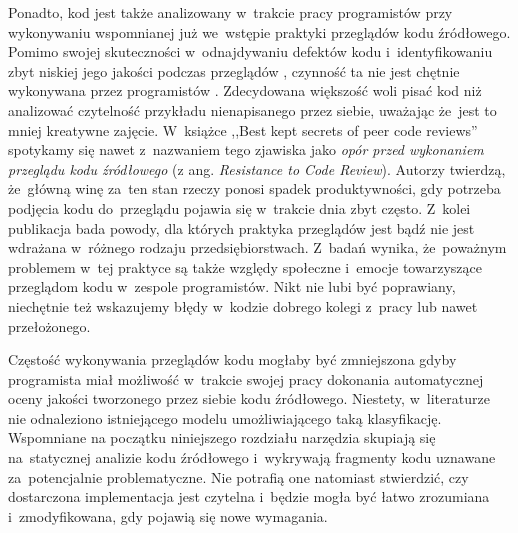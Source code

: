\documentclass[twoside]{praca}
\begin{document}
Ponadto, kod jest także analizowany w~trakcie pracy programistów przy wykonywaniu wspomnianej już we~wstępie praktyki przeglądów kodu źródłowego. Pomimo swojej skuteczności w~odnajdywaniu defektów kodu i~identyfikowaniu zbyt niskiej jego jakości podczas przeglądów \cite{beller2014modern, kemerer2009impact}, czynność ta nie jest chętnie wykonywana przez programistów \cite{cohen2006best}. Zdecydowana większość woli pisać kod niż analizować czytelność przykładu nienapisanego przez siebie, uważając że~jest to mniej kreatywne zajęcie. W~książce ,,Best kept secrets of peer code reviews'' \cite{cohen2006best} spotykamy się nawet z~nazwaniem tego zjawiska jako \textit{opór przed wykonaniem przeglądu kodu źródłowego} (z ang. \textit{Resistance to Code Review}). Autorzy twierdzą, że~główną winę za~ten stan rzeczy ponosi spadek produktywności, gdy potrzeba podjęcia kodu do~przeglądu pojawia się w~trakcie dnia zbyt często. Z~kolei publikacja \cite{baum2016factors} bada powody, dla których praktyka przeglądów jest bądź nie jest wdrażana w~różnego rodzaju przedsiębiorstwach. Z~badań wynika, że~poważnym problemem w~tej praktyce są także względy społeczne i~emocje towarzyszące przeglądom kodu w~zespole programistów. Nikt nie lubi być poprawiany, niechętnie też wskazujemy błędy w~kodzie dobrego kolegi z~pracy lub nawet przełożonego.

Częstość wykonywania przeglądów kodu mogłaby być zmniejszona gdyby programista miał możliwość w~trakcie swojej pracy dokonania automatycznej oceny jakości tworzonego przez siebie kodu źródłowego. Niestety, w~literaturze nie odnaleziono istniejącego modelu umożliwiającego taką klasyfikację.
Wspomniane na początku niniejszego rozdziału narzędzia skupiają się na~statycznej analizie kodu źródłowego i~wykrywają fragmenty kodu uznawane za~potencjalnie problematyczne. Nie potrafią one natomiast stwierdzić, czy dostarczona implementacja jest czytelna i~będzie mogła być łatwo zrozumiana i~zmodyfikowana, gdy pojawią się nowe wymagania.

\end{document}
